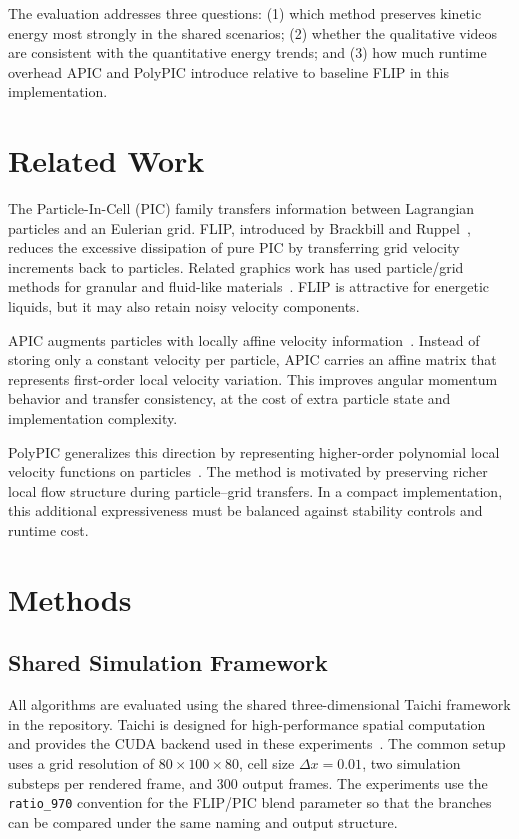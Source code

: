 \documentclass[conference]{IEEEtran}
\begin{document}
The evaluation addresses three questions: (1) which method preserves kinetic energy most strongly in the shared scenarios; (2) whether the qualitative videos are consistent with the quantitative energy trends; and (3) how much runtime overhead APIC and PolyPIC introduce relative to baseline FLIP in this implementation.

\section{Related Work}

The Particle-In-Cell (PIC) family transfers information between Lagrangian particles and an Eulerian grid. FLIP, introduced by Brackbill and Ruppel~\cite{brackbill1986flip}, reduces the excessive dissipation of pure PIC by transferring grid velocity increments back to particles. Related graphics work has used particle/grid methods for granular and fluid-like materials~\cite{zhu2005sand}. FLIP is attractive for energetic liquids, but it may also retain noisy velocity components.

APIC augments particles with locally affine velocity information~\cite{jiang2015apic}. Instead of storing only a constant velocity per particle, APIC carries an affine matrix that represents first-order local velocity variation. This improves angular momentum behavior and transfer consistency, at the cost of extra particle state and implementation complexity.

PolyPIC generalizes this direction by representing higher-order polynomial local velocity functions on particles~\cite{fu2017polypic}. The method is motivated by preserving richer local flow structure during particle--grid transfers. In a compact implementation, this additional expressiveness must be balanced against stability controls and runtime cost.

\section{Methods}

\subsection{Shared Simulation Framework}

All algorithms are evaluated using the shared three-dimensional Taichi framework in the repository. Taichi is designed for high-performance spatial computation and provides the CUDA backend used in these experiments~\cite{hu2019taichi}. The common setup uses a grid resolution of $80 \times 100 \times 80$, cell size $\Delta x = 0.01$, two simulation substeps per rendered frame, and 300 output frames. The experiments use the \texttt{ratio\_970} convention for the FLIP/PIC blend parameter so that the branches can be compared under the same naming and output structure.
\end{document}

